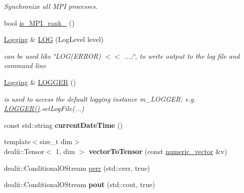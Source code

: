 \begin{DoxyCompactItemize}
\begin{DoxyCompactList}\small\item\em Synchronize all MPI processes. \item\end{DoxyCompactList}\item 
bool \hyperlink{namespacenatrium_a791202a0d8b6bdac2c62f3ae63905a36}{is\_\-MPI\_\-rank\_} ()
\item 
\hyperlink{classnatrium_1_1Logging}{Logging} \& \hyperlink{namespacenatrium_a0590621d19e4629e6afb5e7365f9f331}{LOG} (LogLevel level)
\begin{DoxyCompactList}\small\item\em can be used like \char`\"{}LOG(ERROR) $<$$<$ ...;\char`\"{}, to write output to the log file and command line \item\end{DoxyCompactList}\item 
\hyperlink{classnatrium_1_1Logging}{Logging} \& \hyperlink{namespacenatrium_a0d879cf404d8a12fc978ab97d33758b4}{LOGGER} ()
\begin{DoxyCompactList}\small\item\em is used to access the default logging instance m\_\-LOGGER; e.g. \hyperlink{namespacenatrium_a0d879cf404d8a12fc978ab97d33758b4}{LOGGER()}.setLogFile(...) \item\end{DoxyCompactList}\item 
\hypertarget{namespacenatrium_acdc05b9a9596bba608cb1af116a15538}{
const std::string {\bfseries currentDateTime} ()}
\label{namespacenatrium_acdc05b9a9596bba608cb1af116a15538}

\item 
\hypertarget{namespacenatrium_ae701d55b10027c6e5affa8bf49f9d87f}{
{\footnotesize template$<$size\_\-t dim$>$ }\\dealii::Tensor$<$ 1, dim $>$ {\bfseries vectorToTensor} (const \hyperlink{namespacenatrium_a67c39077adc6634f8fa3762b8eef24c4}{numeric\_\-vector} \&v)}
\label{namespacenatrium_ae701d55b10027c6e5affa8bf49f9d87f}

\item 
dealii::ConditionalOStream \hyperlink{namespacenatrium_a5493e61c5fe1935bc9975d78a24dceda}{perr} (std::cerr, true)
\item 
\hypertarget{namespacenatrium_af2d0f99c55fb56378ad9d31eedd3e45d}{
dealii::ConditionalOStream {\bfseries pout} (std::cout, true)}
\label{namespacenatrium_af2d0f99c55fb56378ad9d31eedd3e45d}


\end{DoxyCompactItemize}
